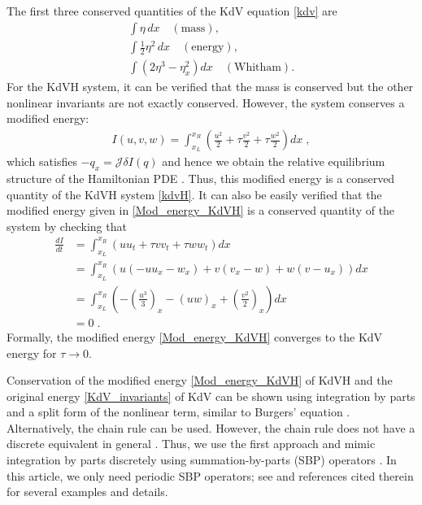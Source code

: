 \documentclass{article}
\newcommand{\ukdv}{\eta}
\begin{document}
The first three conserved quantities of the KdV equation \eqref{kdv} are
\begin{subequations} \label{KdV_invariants}
    \begin{align}
        \int \ukdv \, dx \quad (\text{mass}), \\
        \int \frac{1}{2} \ukdv^2 \, dx \quad (\text{energy}), \\
        \int \left(2\ukdv^3 - \ukdv_x^2\right) dx \quad (\text{Whitham}).
    \end{align}
\end{subequations}
For the KdVH system, it can be verified that the mass is conserved but the
other nonlinear invariants are not exactly conserved.  However, the system
conserves a modified energy:
\begin{align}\label{Mod_energy_KdVH}
    I(u,v,w) = \int_{x_L}^{x_R} \left(\frac{u^2}{2} + \tau \frac{v^2}{2} + \tau \frac{w^2}{2}\right) dx \;,
\end{align}
which satisfies $ -q_x = \mathcal{J} \delta I(q) $ and hence we obtain the relative equilibrium structure of the Hamiltonian PDE \cite{duran1998numerical,duran2000numerical}.
Thus, this modified energy is a conserved quantity of the KdVH system \eqref{kdvH}.
It can also be easily verified that the modified energy given in \eqref{Mod_energy_KdVH} is a conserved quantity of the system by checking that
\begin{align*}
\frac{dI}{dt} & = \int_{x_L}^{x_R} \left(uu_t + \tau vv_t + \tau ww_t\right) dx \\
              & = \int_{x_L}^{x_R} \left(u (-uu_x - w_x) + v (v_x-w) + w (v-u_x)\right) dx \\
              & = \int_{x_L}^{x_R} \left(-\left(\frac{u^3}{3}\right)_x-(uw)_x+\left(\frac{v^2}{2}\right)_x\right) dx \\
              & = 0 \;.
\end{align*}
Formally, the modified energy \eqref{Mod_energy_KdVH} converges to the KdV energy
for $\tau \to 0$.


Conservation of the modified energy \eqref{Mod_energy_KdVH} of KdVH and
the original energy \eqref{KdV_invariants} of KdV can be shown using
integration by parts and a split form of the nonlinear term, similar to
Burgers' equation \cite[eq.~(6.40)]{richtmyer1967difference}. Alternatively,
the chain rule can be used. However, the chain rule does not have a discrete
equivalent in general \cite{ranocha2019mimetic}. Thus, we use the first
approach and mimic integration by parts discretely using
summation-by-parts (SBP) operators \cite{svard2014review,fernandez2014review}.
In this article, we only need periodic SBP operators; see \cite{ranocha2021broad}
and references cited therein for several examples and details.
\end{document}
